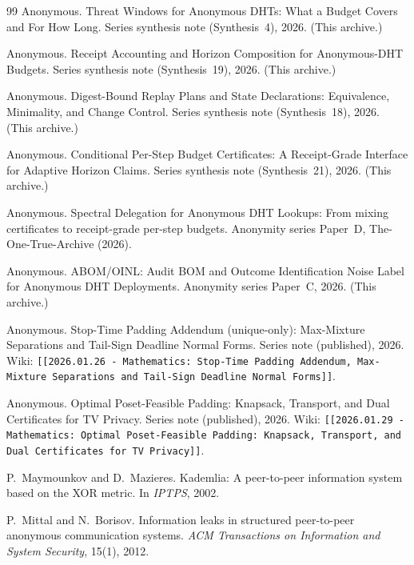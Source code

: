 \documentclass[11pt]{article}
\begin{document}
\begin{thebibliography}{99}
Anonymous.
\newblock Threat Windows for Anonymous {DHT}s: What a Budget Covers and For How Long.
\newblock Series synthesis note (Synthesis~4), 2026. (This archive.)

Anonymous.
\newblock Receipt Accounting and Horizon Composition for Anonymous-DHT Budgets.
\newblock Series synthesis note (Synthesis~19), 2026. (This archive.)

Anonymous.
\newblock Digest-Bound Replay Plans and State Declarations: Equivalence, Minimality, and Change Control.
\newblock Series synthesis note (Synthesis~18), 2026. (This archive.)

Anonymous.
\newblock Conditional Per-Step Budget Certificates: A Receipt-Grade Interface for Adaptive Horizon Claims.
\newblock Series synthesis note (Synthesis~21), 2026. (This archive.)

Anonymous.
\newblock Spectral Delegation for Anonymous DHT Lookups: From mixing certificates to receipt-grade per-step budgets.
\newblock Anonymity series Paper~D, The-One-True-Archive (2026).

Anonymous.
\newblock ABOM/OINL: Audit BOM and Outcome Identification Noise Label for Anonymous DHT Deployments.
\newblock Anonymity series Paper~C, 2026. (This archive.)

Anonymous.
\newblock Stop-Time Padding Addendum (unique-only): Max-Mixture Separations and Tail-Sign Deadline Normal Forms.
\newblock Series note (published), 2026.
\newblock Wiki: \texttt{[[2026.01.26 - Mathematics: Stop-Time Padding Addendum, Max-Mixture Separations and Tail-Sign Deadline Normal Forms]]}.

Anonymous.
\newblock Optimal Poset-Feasible Padding: Knapsack, Transport, and Dual Certificates for TV Privacy.
\newblock Series note (published), 2026.
\newblock Wiki: \texttt{[[2026.01.29 - Mathematics: Optimal Poset-Feasible Padding: Knapsack, Transport, and Dual Certificates for TV Privacy]]}.

P.~Maymounkov and D.~Mazieres.
\newblock Kademlia: A peer-to-peer information system based on the XOR metric.
\newblock In \emph{IPTPS}, 2002.

P.~Mittal and N.~Borisov.
\newblock Information leaks in structured peer-to-peer anonymous communication systems.
\newblock \emph{ACM Transactions on Information and System Security}, 15(1), 2012.


\end{thebibliography}
\end{document}
